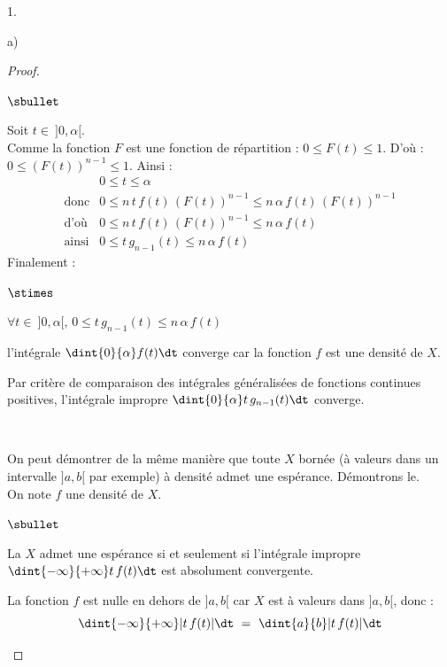 \begin{noliste}{1.}
\begin{noliste}{a)}
\begin{proof}
\begin{noliste}{$\sbullet$}
	
	\item Soit $t \in \ ]0, \alpha[$.\\
	Comme la fonction $F$ est une fonction de répartition : 
	$0 \leq F(t) \leq 1$. D'où : $0 \leq (F(t))^{n-1} \leq 1$.
	Ainsi :
	\[
	  \begin{array}{cl}
	    & 0 \leq t \leq \alpha
	    \\[.4cm]
	    \text{donc} & 0 \leq n \, t \, f(t) \, (F(t))^{n-1} \leq
	    n \, \alpha \, f(t) \, (F(t))^{n-1}
	    \\[.4cm]
	    \text{d'où} & 0 \leq n \, t \, f(t) \, (F(t))^{n-1} \leq
	    n \, \alpha \, f(t)
	    \\[.4cm]
	    \text{ainsi} & 0 \leq t \, g_{n-1}(t) \leq n \, \alpha \,
	    f(t)
	  \end{array}
	\]
	Finalement :
	\begin{noliste}{$\stimes$}
	  \item $\forall t \in \ ]0,\alpha[$, $0 \leq t \, g_{n-1}(t)
	  \leq n \, \alpha \, f(t)$
	  \item l'intégrale $\dint{0}{\alpha} f(t) \dt$ converge 
	  car la fonction $f$ est une densité de $X$.
	\end{noliste}
	Par critère de comparaison des intégrales généralisées de 
	fonctions continues positives, l'intégrale impropre 
	$\dint{0}{\alpha} t \, g_{n-1}(t) \dt$ converge.
      \end{noliste}
      ~\\[-1.2cm]
      
      \begin{remarkL}{.96}
        On peut démontrer de la même manière que toute \var $X$ bornée
        (à valeurs dans un intervalle $]a,b[$ par exemple)
        à densité admet une espérance. Démontrons le.\\[.1cm]
        On note $f$ une densité de $X$. 
        \begin{noliste}{$\sbullet$}
          \item La \var $X$ admet une espérance si et seulement si 
          l'intégrale impropre $\dint{-\infty}{+\infty} t \, f(t) \dt$
          est absolument convergente.
          
          \item La fonction $f$ est nulle en dehors de $]a,b[$ car 
          $X$ est à valeurs dans $]a,b[$, donc :
          \[
            \dint{-\infty}{+\infty} \vert t \, f(t) \vert \dt \ = \
            \dint{a}{b} \vert t \, f(t) \vert \dt
          \]
          

\end{noliste}
\end{remarkL}
\end{proof}
\end{noliste}
\end{noliste}
